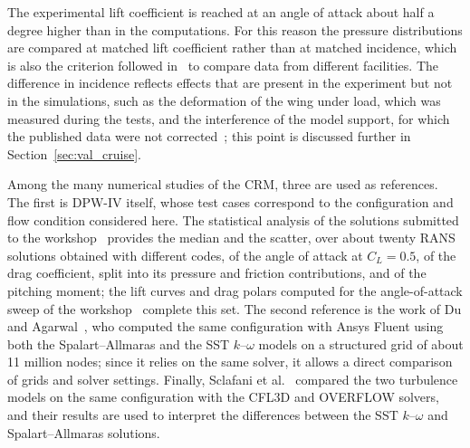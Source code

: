 The experimental lift coefficient is reached at an angle of attack about half a degree higher than in the computations. For this reason the pressure distributions are compared at matched lift coefficient rather than at matched incidence, which is also the criterion followed in~\cite{rivers2015} to compare data from different facilities. The difference in incidence reflects effects that are present in the experiment but not in the simulations, such as the deformation of the wing under load, which was measured during the tests, and the interference of the model support, for which the published data were not corrected~\cite{rivers2015}; this point is discussed further in Section~\ref{sec:val_cruise}.

Among the many numerical studies of the CRM, three are used as references. The first is DPW-IV itself, whose test cases correspond to the configuration and flow condition considered here. The statistical analysis of the solutions submitted to the workshop~\cite{morrison2010} provides the median and the scatter, over about twenty RANS solutions obtained with different codes, of the angle of attack at $C_L = 0.5$, of the drag coefficient, split into its pressure and friction contributions, and of the pitching moment; the lift curves and drag polars computed for the angle-of-attack sweep of the workshop~\cite{vassberg2010} complete this set. The second reference is the work of Du and Agarwal~\cite{du2017}, who computed the same configuration with Ansys Fluent using both the Spalart--Allmaras and the SST $k$--$\omega$ models on a structured grid of about 11 million nodes; since it relies on the same solver, it allows a direct comparison of grids and solver settings.
Finally, Sclafani et al.~\cite{sclafani2010} compared the two turbulence models on the same configuration with the CFL3D and OVERFLOW solvers, and their results are used to interpret the differences between the SST $k$--$\omega$ and Spalart--Allmaras solutions.


